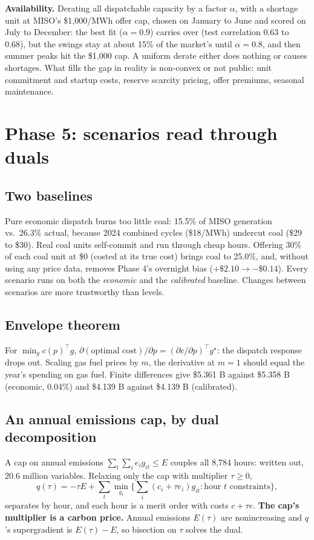 \documentclass[11pt]{article}
\begin{document}
\textbf{Availability.} Derating all dispatchable capacity by a factor $\alpha$, with a shortage unit at MISO's \$1{,}000/MWh offer cap, chosen on January to June and scored on July to December: the best fit ($\alpha = 0.9$) carries over (test correlation 0.63 to 0.68), but the swings stay at about 15\% of the market's until $\alpha = 0.8$, and then summer peaks hit the \$1{,}000 cap. A uniform derate either does nothing or causes shortages. What fills the gap in reality is non-convex or not public: unit commitment and startup costs, reserve scarcity pricing, offer premiums, seasonal maintenance.

\section{Phase 5: scenarios read through duals}

\subsection{Two baselines}
Pure economic dispatch burns too little coal: 15.5\% of MISO generation vs.\ 26.3\% actual, because 2024 combined cycles (\$18/MWh) undercut coal (\$29 to \$30). Real coal units self-commit and run through cheap hours. Offering 30\% of each coal unit at \$0 (costed at its true cost) brings coal to 25.0\%, and, without using any price data, removes Phase 4's overnight bias ($+\$2.10 \to -\$0.14$). Every scenario runs on both the \emph{economic} and the \emph{calibrated} baseline. Changes between scenarios are more trustworthy than levels.

\subsection{Envelope theorem}
For $\min_g c(p)^\top g$, $\partial(\text{optimal cost})/\partial p = (\partial c/\partial p)^\top g^\star$: the dispatch response drops out. Scaling gas fuel prices by $m$, the derivative at $m = 1$ should equal the year's spending on gas fuel. Finite differences give \$5.361 B against \$5.358 B (economic, 0.04\%) and \$4.139 B against \$4.139 B (calibrated).

\subsection{An annual emissions cap, by dual decomposition}
A cap on annual emissions $\sum_t \sum_i e_i g_{it} \le E$ couples all 8{,}784 hours: written out, 20.6 million variables. Relaxing only the cap with multiplier $\tau \ge 0$,
\begin{equation}
q(\tau) = -\tau E + \sum_t \min_{g_t} \Big\{ \sum_i (c_i + \tau e_i) g_{it} : \text{hour } t \text{ constraints} \Big\},
\end{equation}
separates by hour, and each hour is a merit order with costs $c + \tau e$. \textbf{The cap's multiplier is a carbon price.} Annual emissions $E(\tau)$ are nonincreasing and $q$'s supergradient is $E(\tau) - E$, so bisection on $\tau$ solves the dual.
\end{document}
